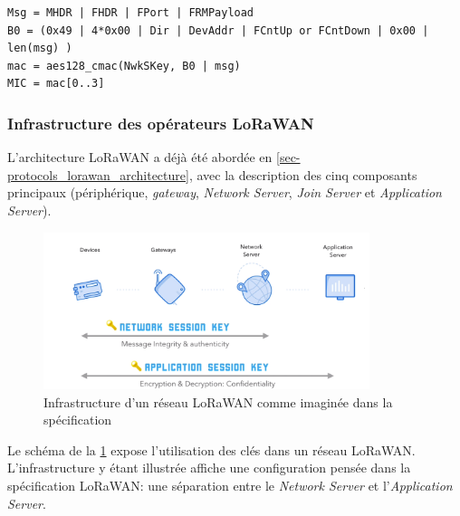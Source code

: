 \begin{tcolorbox}[top=-3mm, bottom=-3mm, left=0mm, right=0mm, enhanced, breakable, colback=LightGray, colframe=DarkGray, colbacktitle=DarkGray]
\begin{verbatim}
Msg = MHDR | FHDR | FPort | FRMPayload
B0 = (0x49 | 4*0x00 | Dir | DevAddr | FCntUp or FCntDown | 0x00 | len(msg) )
mac = aes128_cmac(NwkSKey, B0 | msg)
MIC = mac[0..3]
\end{verbatim}
\end{tcolorbox}


\subsubsection{Infrastructure des opérateurs LoRaWAN}
\label{sec-security_lorawan_providers}


L'architecture LoRaWAN a déjà été abordée en \cref{sec-protocols_lorawan_architecture}, avec la description des cinq composants principaux (périphérique, \textit{gateway}, \textit{Network Server}, \textit{Join Server} et \textit{Application Server}). \\

\begin{figure}[ht!]
    \centering
    \includegraphics[width=0.85\textwidth]{Figures/Security/LoRaWAN/by_design_keys.PNG}
    \caption{Infrastructure d'un réseau LoRaWAN comme imaginée dans la spécification}
    \label{fig-by_design_keys}
\end{figure}

Le schéma de la \cref{fig-by_design_keys} expose l'utilisation des clés dans un réseau LoRaWAN. L'infrastructure y étant illustrée affiche une configuration pensée dans la spécification LoRaWAN: une séparation entre le \textit{Network Server} et l'\textit{Application Server}. \\

